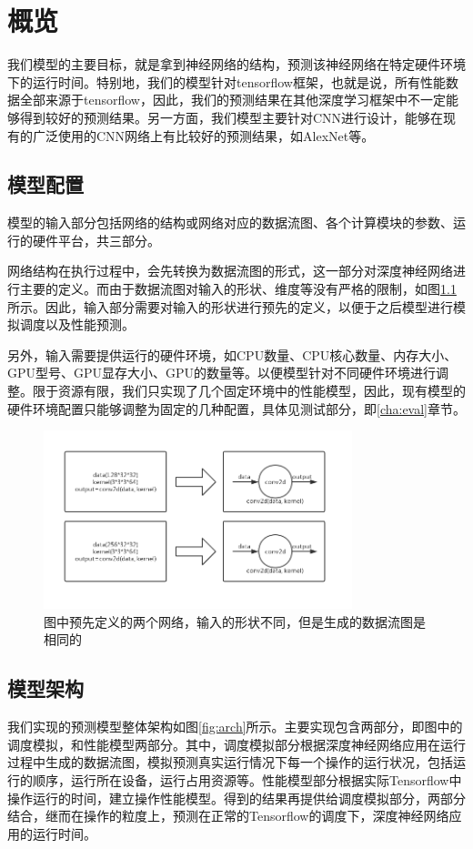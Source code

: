 \chapter{概览}
\label{cap:overview}
    我们模型的主要目标，就是拿到神经网络的结构，预测该神经网络在特定硬件环境下的运行时间。特别地，我们的模型针对tensorflow框架，也就是说，所有性能数据全部来源于tensorflow，因此，我们的预测结果在其他深度学习框架中不一定能够得到较好的预测结果。另一方面，我们模型主要针对CNN进行设计，能够在现有的广泛使用的CNN网络上有比较好的预测结果，如AlexNet\cite{alexnet}等。
    
\section{模型配置}
    模型的输入部分包括网络的结构或网络对应的数据流图、各个计算模块的参数、运行的硬件平台，共三部分。
    
    网络结构在执行过程中，会先转换为数据流图的形式，这一部分对深度神经网络进行主要的定义。而由于数据流图对输入的形状、维度等没有严格的限制，如图\ref{fig:dag_same}所示。因此，输入部分需要对输入的形状进行预先的定义，以便于之后模型进行模拟调度以及性能预测。
    
    另外，输入需要提供运行的硬件环境，如CPU数量、CPU核心数量、内存大小、GPU型号、GPU显存大小、GPU的数量等。以便模型针对不同硬件环境进行调整。限于资源有限，我们只实现了几个固定环境中的性能模型，因此，现有模型的硬件环境配置只能够调整为固定的几种配置，具体见测试部分，即\ref{cha:eval}章节。

    \begin{figure}[!htbp]
        \centering
        \includegraphics[width=0.8\textwidth]{figures/dag_same.jpg}
        \caption{图中预先定义的两个网络，输入的形状不同，但是生成的数据流图是相同的}
        \label{fig:dag_same}
    \end{figure}
    
\section{模型架构}    
    我们实现的预测模型整体架构如图\ref{fig:arch}所示。主要实现包含两部分，即图中的调度模拟，和性能模型两部分。其中，调度模拟部分根据深度神经网络应用在运行过程中生成的数据流图，模拟预测真实运行情况下每一个操作的运行状况，包括运行的顺序，运行所在设备，运行占用资源等。性能模型部分根据实际Tensorflow中操作运行的时间，建立操作性能模型。得到的结果再提供给调度模拟部分，两部分结合，继而在操作的粒度上，预测在正常的Tensorflow的调度下，深度神经网络应用的运行时间。
    
